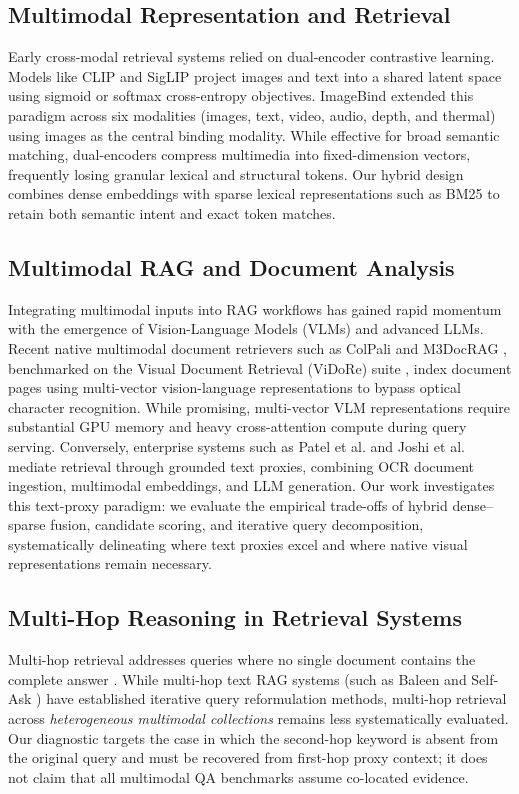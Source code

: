 \documentclass[conference]{IEEEtran}
\begin{document}
\subsection{Multimodal Representation and Retrieval}
Early cross-modal retrieval systems relied on dual-encoder contrastive learning. Models like CLIP \cite{radford2021clip} and SigLIP \cite{zhai2023siglip} project images and text into a shared latent space using sigmoid or softmax cross-entropy objectives. ImageBind \cite{girdhar2023imagebind} extended this paradigm across six modalities (images, text, video, audio, depth, and thermal) using images as the central binding modality. While effective for broad semantic matching, dual-encoders compress multimedia into fixed-dimension vectors, frequently losing granular lexical and structural tokens. Our hybrid design combines dense embeddings with sparse lexical representations such as BM25 \cite{robertson2009bm25} to retain both semantic intent and exact token matches.

\subsection{Multimodal RAG and Document Analysis}
Integrating multimodal inputs into RAG workflows has gained rapid momentum with the emergence of Vision-Language Models (VLMs) and advanced LLMs. Recent native multimodal document retrievers such as ColPali \cite{faysse2024colpali} and M3DocRAG \cite{cho2024m3docrag}, benchmarked on the Visual Document Retrieval (ViDoRe) suite \cite{faysse2024vidore}, index document pages using multi-vector vision-language representations to bypass optical character recognition. While promising, multi-vector VLM representations require substantial GPU memory and heavy cross-attention compute during query serving. Conversely, enterprise systems such as Patel et al. \cite{patel2025multimodal} and Joshi et al. \cite{joshi2024multimodel} mediate retrieval through grounded text proxies, combining OCR document ingestion, multimodal embeddings, and LLM generation. Our work investigates this text-proxy paradigm: we evaluate the empirical trade-offs of hybrid dense--sparse fusion, candidate scoring, and iterative query decomposition, systematically delineating where text proxies excel and where native visual representations remain necessary.

\subsection{Multi-Hop Reasoning in Retrieval Systems}
Multi-hop retrieval addresses queries where no single document contains the complete answer \cite{xiong2021multihop, khattab2021baleen}. While multi-hop text RAG systems (such as Baleen \cite{khattab2021baleen} and Self-Ask \cite{press2023selfask}) have established iterative query reformulation methods, multi-hop retrieval across \textit{heterogeneous multimodal collections} remains less systematically evaluated. Our diagnostic targets the case in which the second-hop keyword is absent from the original query and must be recovered from first-hop proxy context; it does not claim that all multimodal QA benchmarks assume co-located evidence.
\end{document}
